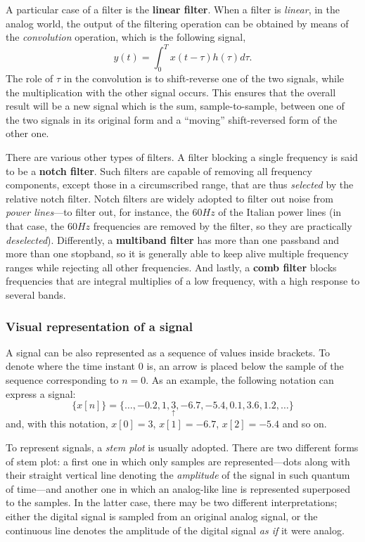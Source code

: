 \documentclass[\documentfontsize, twocolumn]{\classname}
\begin{document}
A particular case of a filter is the \textbf{linear filter}. When a filter is \emph{linear}, in the analog world, the output of the filtering operation can be obtained by means of the \emph{convolution} operation, which is the following signal,
\[
y(t) = \int_0^T x(t - \tau)h(\tau)d\tau.
\]
The role of $\tau$ in the convolution is to shift-reverse one of the two signals, while the multiplication with the other signal occurs. This ensures that the overall result will be a new signal which is the sum, sample-to-sample, between one of the two signals in its original form and a ``moving'' shift-reversed form of the other one.

There are various other types of filters. A filter blocking a single frequency is said to be a \textbf{notch filter}. Such filters are capable of removing all frequency components, except those in a circumscribed range, that are thus \emph{selected} by the relative notch filter. Notch filters are widely adopted to filter out noise from \emph{power lines}---to filter out, for instance, the $60Hz$ of the Italian power lines (in that case, the $60Hz$ frequencies are removed by the filter, so they are practically \emph{deselected}). Differently, a \textbf{multiband filter} has more than one passband and more than one stopband, so it is generally able to keep alive multiple frequency ranges while rejecting all other frequencies. And lastly, a \textbf{comb filter} blocks frequencies that are integral multiplies of a low frequency, with a high response to several bands.

\subsubsection{Visual representation of a signal}

A signal can be also represented as a se\-quen\-ce of values inside brackets. To
denote where the time instant $0$ is, an arrow is placed below the sample of the
se\-quen\-ce corresponding to $n=0$. As an example, the following notation can express a signal:
\[ \{x[n]\} = \{\dots, -0.2,1,\underset{\uparrow}{3},-6.7,-5.4,0.1,3.6,1.2,\dots\}\] and, with this notation, $x[0]=3$, $x[1] = -6.7$, $x[2] = -5.4$ and so on.

To represent signals, a \emph{stem plot} is usually adopted. There are two
different forms of stem plot: a first one in which only samples are
represented---dots along with their straight vertical line denoting the
\emph{amplitude} of the signal in such quantum of time---and another one in
which an analog-like line is represented superposed to the samples. In the
latter case, there may be two different interpretations; either the digital
signal is sampled from an original analog signal, or the continuous line
denotes the amplitude of the digital signal \emph{as if} it were analog.
\end{document}
